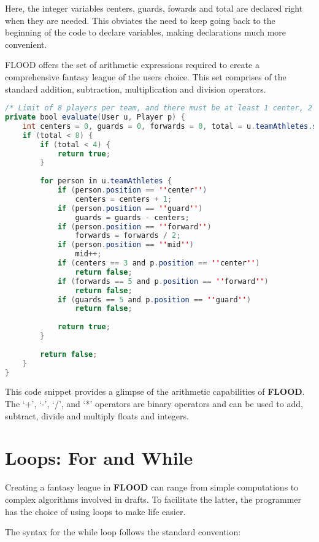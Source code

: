 \documentclass[12pt]{report}
\begin{document}
\begin{doublespace}
Here, the integer variables centers, guards, fowards and total are declared right when they are needed. This obviates the need to keep going back to the beginning of the code to declare variables, making declarations much more convenient.

FLOOD offers the set of arithmetic expressions required to create a comprehensive fantasy league of the users choice. This set comprises of the standard  addition, subtraction, multiplication and division operators. 
\end{doublespace}

\begin{lstlisting}[language=Java,label=some-code,caption=SnakeDraft.fld]
/* Limit of 8 players per team, and there must be at least 1 center, 2 guards and 2 forwards per team. */
private bool evaluate(User u, Player p) {
	int centers = 0, guards = 0, forwards = 0, total = u.teamAthletes.size();
	if (total < 8) {
		if (total < 4) {
			return true;
		}
		
		for person in u.teamAthletes {
			if (person.position == ''center'')
				centers = centers + 1;
			if (person.position == ''guard'')
				guards = guards - centers;
			if (person.position == ''forward'')
				forwards = forwards / 2;
			if (person.position == ''mid'')
				mid++;
			if (centers == 3 and p.position == ''center'')
				return false;
			if (forwards == 5 and p.position == ''forward'')
				return false;
			if (guards == 5 and p.position == ''guard'')
				return false;
		
			return true;
		}
	
		return false;
	}
}
\end{lstlisting}

\begin{doublespace}
This code snippet provides a glimpse of the arithmetic capabilities of \textbf{FLOOD}. The `+', `-', `/', and `*' operators are binary operators and can be used to add, subtract, divide and multiply floats and integers.
\end{doublespace}

\section{Loops: For and While}

\begin{doublespace}
Creating a fantasy league in \textbf{FLOOD} can range from simple computations to complex algorithms involved in drafts. To facilitate the latter, the programmer has the choice of using loops to make life easier.

The syntax for the while loop follows the standard convention:
\end{doublespace}
\end{document}
